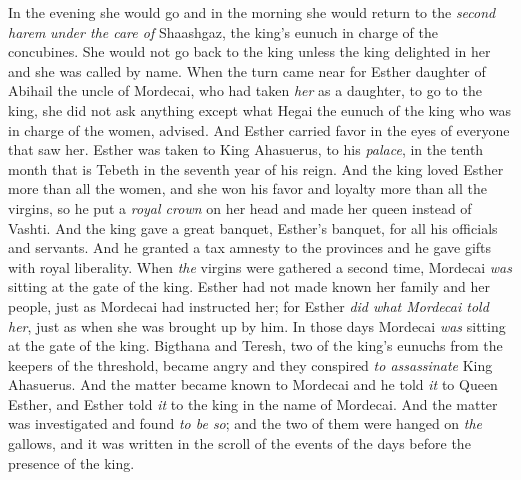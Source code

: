 \begin{biblechapter}
\verse In the evening she would go and in the morning she would return to the \textit{second harem} \textit{under the care of} Shaashgaz, the king’s eunuch in charge of the concubines. She would not go back to the king unless the king delighted in her and she was called by name.
\verse When the turn came near for Esther daughter of Abihail the uncle of Mordecai, who had taken \textit{her} as a daughter, to go to the king, she did not ask anything except what Hegai the eunuch of the king who was in charge of the women, advised. And Esther carried favor in the eyes of everyone that saw her.
\verse Esther was taken to King Ahasuerus, to his \textit{palace}, in the tenth month that is Tebeth in the seventh year of his reign.
\verse And the king loved Esther more than all the women, and she won his favor and loyalty more than all the virgins, so he put a \textit{royal crown} on her head and made her queen instead of Vashti.
\verse And the king gave a great banquet, Esther’s banquet, for all his officials and servants. And he granted a tax amnesty to the provinces and he gave gifts with royal liberality.
 When \textit{the} virgins were gathered a second time, Mordecai \textit{was} sitting at the gate of the king.
\verse Esther had not made known her family and her people, just as Mordecai had instructed her; for Esther \textit{did what Mordecai told her}, just as when she was brought up by him.
\verse In those days Mordecai \textit{was} sitting at the gate of the king. Bigthana and Teresh, two of the king’s eunuchs from the keepers of the threshold, became angry and they conspired \textit{to assassinate} King Ahasuerus.
\verse And the matter became known to Mordecai and he told \textit{it} to Queen Esther, and Esther told \textit{it} to the king in the name of Mordecai.
\verse And the matter was investigated and found \textit{to be so}; and the two of them were hanged on \textit{the} gallows, and it was written in the scroll of the events of the days before the presence of the king.
\end{biblechapter}


